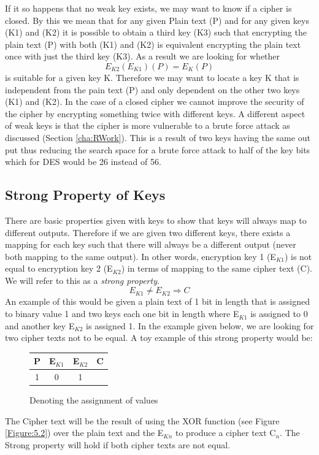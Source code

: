 \documentclass[11pt,a4paper, notitlepage]{report}
\begin{document}
If it so happens that no weak key exists, we may want to know if a cipher is closed. By this we mean that for any given Plain text (P) and for any given keys (K1) and (K2) it is possible to obtain a third key (K3) such that encrypting the plain text (P) with both (K1) and (K2) is equivalent encrypting the plain text once with just the third key (K3). As a result we are looking for whether
\begin{displaymath}
E_{K2}(E_{K1})(P) = E_{K}(P)
\end{displaymath} 
is suitable for a given key K. Therefore we may want to locate a key K that is independent from the pain text (P) and only dependent on the other two keys (K1) and (K2). In the case of a closed cipher we cannot improve the security of the cipher by encrypting something twice with different keys. A different aspect of weak keys is that the cipher is more vulnerable to a brute force attack as discussed (Section \ref{cha:RWork}). This is a result of two keys having the same out put thus reducing the search space for a brute force attack to half of the key bits which for DES would be 26 instead of 56. 








\subsection{Strong Property of Keys}
\label{subsec:StrongKeys}

There are basic properties given with keys to show that keys will always map to different outputs. Therefore if we are given two different keys, there exists a mapping for each key such that there will always be a different output (never both mapping to the same output). In other words, encryption key 1 (E$_{K1}$) is not equal to encryption key 2 (E$_{K2}$) in terms of mapping to the same cipher text (C). We will refer to this as a \emph{strong property}.  
\begin{displaymath}
E_{K1} \neq E_{K2} \Rightarrow C
\end{displaymath}
An example of this would be given a plain text of 1 bit in length that is assigned to binary value 1 and two keys each one bit in length where E$_{K1}$ is assigned to 0 and another key E$_{K2}$ is assigned 1. In the example given below, we are looking for two cipher texts not to be equal.
A toy example of this strong property would be:

\begin{figure}[H]
\centering
\label{tab:assignment of values}
\begin{tabular}{|c|c|c|c|}
\hline
P & E$_{K1}$ & E$_{K2}$ & C \\ \hline
1 & 0 & 1 & {}\\
\hline
\end{tabular}
\caption{Denoting the assignment of values}
\end{figure}
The Cipher text will be the result of using the XOR function (see Figure \ref{Figure:5.2}) over the plain text and the E$_{Kn}$ to produce a cipher text C$_n$. The Strong property will hold if both cipher texts are not equal.
\end{document}
